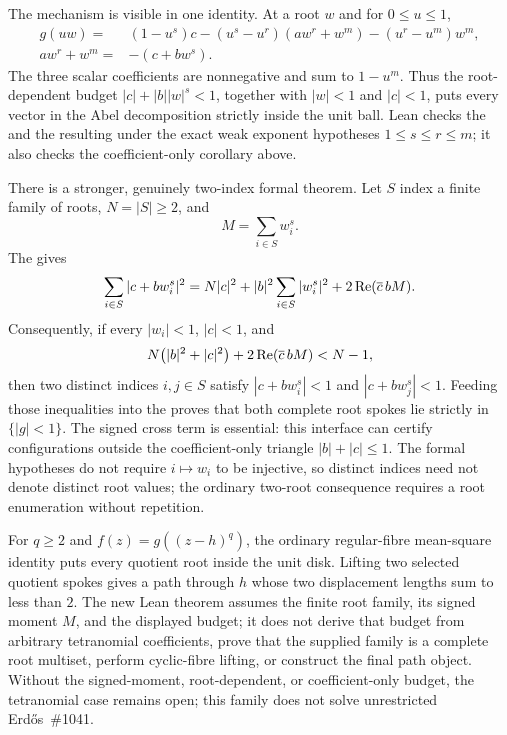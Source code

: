 \documentclass[11pt]{article}
\begin{document}
The mechanism is visible in one identity.  At a root $w$ and for
$0\le u\le1$,
\[
\begin{split}
 g(uw)={}&(1-u^s)c
  -(u^s-u^r)(aw^r+w^m)
  -(u^r-u^m)w^m,\\
 aw^r+w^m={}&-(c+bw^s).
\end{split}
\]
The three scalar coefficients are nonnegative and sum to $1-u^m$.  Thus the
root-dependent budget $|c|+|b||w|^s<1$, together with $|w|<1$ and $|c|<1$,
puts every vector in the Abel decomposition strictly inside the unit ball.
Lean checks the 
and the resulting  under
the exact weak exponent hypotheses $1\le s\le r\le m$; it also checks the
coefficient-only corollary above.

There is a stronger, genuinely two-index formal theorem.  Let $S$ index a
finite family of roots, $N=|S|\ge2$, and
\[
  M=\sum_{i\in S}w_i^s.
\]
The  gives
\[
 \sum_{i\in S}|c+bw_i^s|^2
 =N|c|^2+|b|^2\sum_{i\in S}|w_i^s|^2
   +2\mathop{\rm Re}(\overline c\,bM).
\]
Consequently, if every $|w_i|<1$, $|c|<1$, and
\[
 N\bigl(|b|^2+|c|^2\bigr)
   +2\mathop{\rm Re}(\overline c\,bM)<N-1,
\]
then two distinct indices $i,j\in S$ satisfy
$|c+bw_i^s|<1$ and $|c+bw_j^s|<1$.  Feeding those inequalities into the
 proves that both complete root spokes lie
strictly in $\{|g|<1\}$.  The signed cross term is essential: this interface
can certify configurations outside the coefficient-only triangle
$|b|+|c|\le1$.  The formal hypotheses do not require $i\mapsto w_i$ to be
injective, so distinct indices need not denote distinct root values; the
ordinary two-root consequence requires a root enumeration without repetition.

For $q\ge2$ and $f(z)=g((z-h)^q)$, the ordinary regular-fibre mean-square
identity puts every quotient root inside the unit disk.  Lifting two selected
quotient spokes gives a path through $h$ whose two displacement lengths sum
to less than $2$.  The new Lean theorem assumes the finite root family, its
signed moment $M$, and the displayed budget; it does not derive that budget
from arbitrary tetranomial coefficients, prove that the supplied family is a
complete root multiset, perform cyclic-fibre lifting, or construct the final
path object.  Without the signed-moment, root-dependent, or coefficient-only
budget, the tetranomial case remains open; this family does not solve
unrestricted Erd\H{o}s~\#1041.
\end{document}
